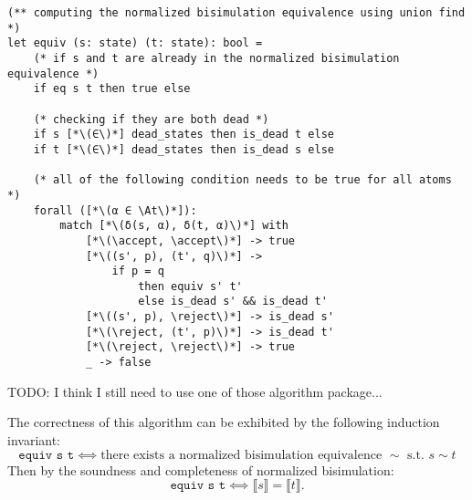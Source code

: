 \documentclass[acmsmall,screen]{acmart}
\newcommand{\At}{\mathbf{At}}
\newcommand{\reject}{\mathinner{\mathtt{Reject}}}
\newcommand{\accept}{\mathinner{\mathtt{Accept}}}
\newcommand{\theoryOf}[1]{\ensuremath{\mathsf{#1}}}
\newcommand{\BExp}{\theoryOf{BExp}}
\begin{document}
\begin{lstlisting}
(** computing the normalized bisimulation equivalence using union find *)
let equiv (s: state) (t: state): bool = 
    (* if s and t are already in the normalized bisimulation equivalence *)
    if eq s t then true else 

    (* checking if they are both dead *)
    if s [*\(∈\)*] dead_states then is_dead t else 
    if t [*\(∈\)*] dead_states then is_dead s else 
    
    (* all of the following condition needs to be true for all atoms *)
    forall ([*\(α ∈ \At\)*]): 
        match [*\(δ(s, α), δ(t, α)\)*] with 
            [*\(\accept, \accept\)*] -> true 
            [*\((s', p), (t', q)\)*] -> 
                if p = q 
                    then equiv s' t' 
                    else is_dead s' && is_dead t'
            [*\((s', p), \reject\)*] -> is_dead s'
            [*\(\reject, (t', p)\)*] -> is_dead t'
            [*\(\reject, \reject\)*] -> true 
            _ -> false
\end{lstlisting}
TODO: I think I still need to use one of those algorithm package... 

The correctness of this algorithm can be exhibited by the following induction invariant:
\[\texttt{equiv s t} ⟺ \text{there exists a normalized bisimulation equivalence \(∼\) s.t. \(s ∼ t\)}\]
Then by the soundness and completeness of normalized bisimulation:
\[\texttt{equiv s t} ⟺ ⟦s⟧ = ⟦t⟧.\]








\end{document}
